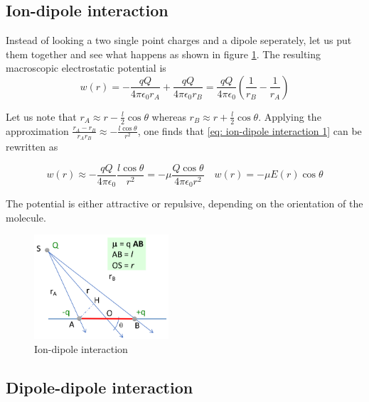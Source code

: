 \documentclass[../phys-f308.tex]{subfiles}
\begin{document}
    \subsection{Ion-dipole interaction}\label{sec: ion-dipole interaction}

    Instead of looking a two single point charges and a dipole seperately, let us put them together and see what happens as shown in figure \ref{fig: ion-dipole interaction}. The resulting macroscopic electrostatic potential is
    \begin{equation}
        w(r) = -\frac{qQ}{4\pi\epsilon_0r_A}+\frac{qQ}{4\pi\epsilon_0r_B} = \frac{qQ}{4\pi\epsilon_0}\left(\frac{1}{r_B}-\frac{1}{r_A}\right)\label{eq: ion-dipole interaction 1}
    \end{equation}

    Let us note that $r_A \approx r-\frac{l}{2}\cos\theta$ whereas $r_B\approx r+\frac{l}{2}\cos\theta$. Applying the approximation $\frac{r_A-r_B}{r_Ar_B}\approx -\frac{l\cos\theta}{r^2}$, one finds that  \eqref{eq: ion-dipole interaction 1} can be rewritten as
    
    \begin{equation}
        w(r) \approx -\frac{qQ}{4\pi\epsilon_0}\frac{l\cos\theta}{r^2} = -\mu\frac{Q\cos\theta}{4\pi\epsilon_0r^2} \quad w(r) = -\mu E(r)\cos\theta
    \end{equation}

    The potential is either attractive or repulsive, depending on the orientation of the molecule.

    \begin{figure}[H]
        \centering
        \includegraphics[width=50mm]{partA/Pictures/DipoleIon.png}
        \caption{Ion-dipole interaction}
        \label{fig: ion-dipole interaction}
    \end{figure}

    \subsection{Dipole-dipole interaction}\label{sec: DDipole interaction}
\end{document}
